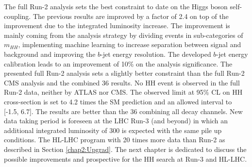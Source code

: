 The full Run-2 \HHyybb analysis sets the best constraint to date on the Higgs boson self-coupling. The previous results are improved by a factor of 2.4 on top of the improvement due to the integrated luminosity increase. The improvement is mainly coming from the analysis strategy by dividing events in sub-categories of $m_{HH}$, implementing machine learning to increase separation between signal and background and improving the $b$-jet energy resolution. The developed $b$-jet energy calibration leads to an improvement of 10\% on the analysis significance. The presented full Run-2 \HHyybb analysis sets a slightly better constraint than the full Run-2 CMS analysis and the combined 36 \ifb results. No HH event is observed in the full Run-2 data, neither by ATLAS nor CMS. The observed limit at 95\% CL on HH cross-section is set to 4.2 times the SM prediction and an allowed \kl interval to [-1.5, 6.7]. The results are better than the 36 \ifb combining all decay channels. New data taking period is foreseen at the LHC Run-3 (and beyond) in which an additional integrated luminosity of 300 \ifb is expected with the same pile up conditions. The HL-LHC program with 20 times more data than Run-2 as described in Section \ref{chap2:Upgrad}. The next chapter is dedicated to discuss the possible improvements and prospective for the HH search at Run-3 and HL-LHC. 